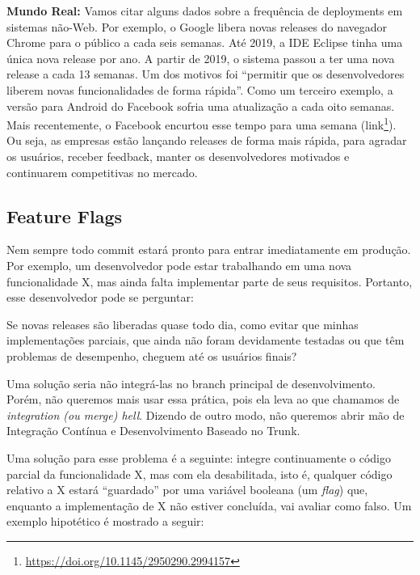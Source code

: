 \documentclass[
  11pt,
  twoside]{book}
\DeclareRobustCommand{\href}[2]{#2\footnote{\url{#1}}}
\renewenvironment{quote}{\centering \vspace{1.5ex} \begin{tcolorbox}[colback=backcolor, width=4.9in]}{\end{tcolorbox}}
\newenvironment{esmbox}{\centering \vspace{1.5ex} \begin{tcolorbox}[breakable, colback=backcolor, width=4.9in]}{\end{tcolorbox} \vspace{1.5ex}}
\begin{document}
\begin{esmbox}

\textbf{Mundo Real:} Vamos citar alguns dados sobre a frequência de
deployments em sistemas não-Web. Por exemplo, o Google libera novas
releases do navegador Chrome para o público a cada seis semanas. Até
2019, a IDE Eclipse tinha uma única nova release por ano. A partir de
2019, o sistema passou a ter uma nova release a cada 13 semanas. Um dos
motivos foi ``permitir que os desenvolvedores liberem novas
funcionalidades de forma rápida''. Como um terceiro exemplo, a versão
para Android do Facebook sofria uma atualização a cada oito semanas.
Mais recentemente, o Facebook encurtou esse tempo para uma semana
(\href{https://doi.org/10.1145/2950290.2994157}{link}). Ou seja, as
empresas estão lançando releases de forma mais rápida, para agradar os
usuários, receber feedback, manter os desenvolvedores motivados e
continuarem competitivas no mercado.

\end{esmbox}

\hypertarget{feature-flags}{%
\subsection{Feature Flags}\label{feature-flags}}

 

Nem sempre todo commit estará pronto para entrar imediatamente em
produção. Por exemplo, um desenvolvedor pode estar trabalhando em uma
nova funcionalidade X, mas ainda falta implementar parte de seus
requisitos. Portanto, esse desenvolvedor pode se perguntar:

\begin{quote}
Se novas releases são liberadas quase todo dia, como evitar que minhas
implementações parciais, que ainda não foram devidamente testadas ou que
têm problemas de desempenho, cheguem até os usuários finais?
\end{quote}

Uma solução seria não integrá-las no branch principal de
desenvolvimento. Porém, não queremos mais usar essa prática, pois ela
leva ao que chamamos de \emph{integration (ou merge) hell}. Dizendo de
outro modo, não queremos abrir mão de Integração Contínua e
Desenvolvimento Baseado no Trunk.

Uma solução para esse problema é a seguinte: integre continuamente o
código parcial da funcionalidade X, mas com ela desabilitada, isto é,
qualquer código relativo a X estará ``guardado'' por uma variável
booleana (um \emph{flag}) que, enquanto a implementação de X não estiver
concluída, vai avaliar como falso. Um exemplo hipotético é mostrado a
seguir:
\end{document}
